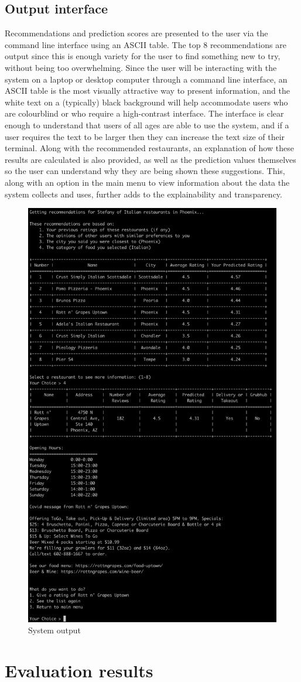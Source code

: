 \documentclass[conference]{IEEEtran}
\begin{document}
\subsection{Output interface}
Recommendations and prediction scores are presented to the user via the command line interface using an ASCII table. 
The top 8 recommendations are output since this is enough variety for the user to find something new to try, 
without being too overwhelming. 
Since the user will be interacting with the system on a laptop or desktop computer through a command line interface, 
an ASCII table is the most visually attractive way to present information, and the white text on a (typically) black 
background will help accommodate users who are colourblind or who require a high-contrast interface. 
The interface is clear enough to understand that users of all ages are able to use the system, and if a user 
requires the text to be larger then they can increase the text size of their terminal. 
Along with the recommended restaurants, an explanation of how these results are calculated is also provided, as 
well as the prediction values themselves so the user can understand why they are being shown these suggestions. 
This, along with an option in the main menu to view information about the data the system collects and uses, 
further adds to the explainability and transparency. 
\begin{figure}
    \centering
    \includegraphics[width=0.4\linewidth]{output.png}
    \caption{System output}
    \label{fig:output}
\end{figure}


\section{Evaluation results}
\end{document}
